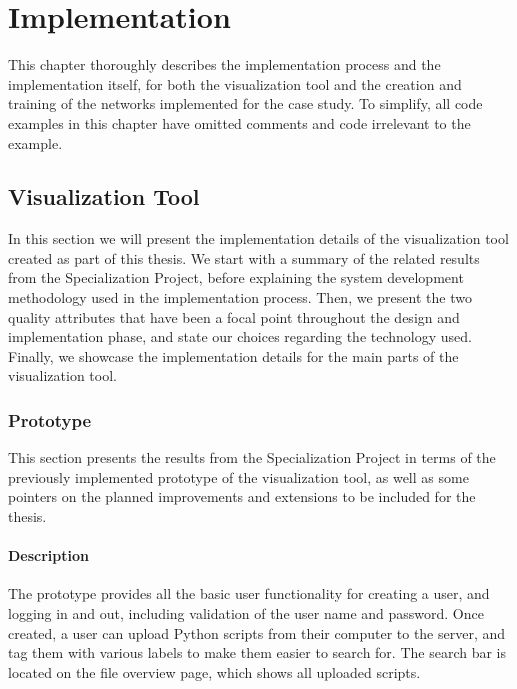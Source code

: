 
\chapter{Implementation}\label{implementation-chap}

This chapter thoroughly describes the implementation process and the implementation itself, for both the visualization tool and the creation and training of the networks implemented for the case study. To simplify, all code examples in this chapter have omitted comments and code irrelevant to the example.

\section{Visualization Tool}

In this section we will present the implementation details of the visualization tool created as part of this thesis. We start with a summary of the related results from the Specialization Project, before explaining the system development methodology used in the implementation process. Then, we present the two quality attributes that have been a focal point throughout the design and implementation phase, and state our choices regarding the technology used. Finally, we showcase the implementation details for the main parts of the visualization tool.

\subsection{Prototype}

This section presents the results from the Specialization Project in terms of the previously implemented prototype of the visualization tool, as well as some pointers on the planned improvements and extensions to be included for the thesis.

\subsubsection{Description}


\noindent The prototype provides all the basic user functionality for creating a user, and logging in and out, including validation of the user name and password. Once created, a user can upload Python scripts from their computer to the server, and tag them with various labels to make them easier to search for. The search bar is located on the file overview page, which shows all uploaded scripts. \\

